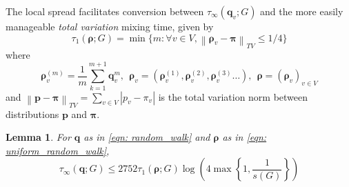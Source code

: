 \documentclass{article}
\newcommand{\abs}[1]{\left \lvert #1 \right \rvert}
\newcommand{\norm}[1]{\left\lVert#1\right\rVert}
\newcommand{\1}{\mathbf{1}}
\newcommand{\pbf}{\mathbf{p}}
\newcommand{\qbf}{\mathbf{q}}
\newcommand{\pibf}{\bm{\pi}}
\newcommand{\rhobf}{\bm{\rho}}
\theoremstyle{aldenthm}
\newtheorem{lemma}{Lemma}
\begin{document}
The local spread facilitates conversion between $\tau_{\infty}(\qbf_v; G)$ and the more easily manageable \emph{total variation} mixing time, given by
\begin{equation*}
\tau_1(\rhobf; G) = \min\biggl\{m: \forall v \in V, \norm{\rhobf_v - \pibf}_{TV} \leq 1/4 \biggr\}
\end{equation*}
where 
\begin{equation}
\label{eqn: uniform_random_walk}
\rhobf_{v}^{(m)} = \frac{1}{m}\sum_{k = 1}^{m+1} \qbf_{v}^{m}, ~~ \rhobf_v = \left( \rhobf_{v}^{(1)}, \rhobf_{v}^{(2)}, \rhobf_{v}^{(3)} \ldots \right), ~~ \rhobf = \left( \rhobf_v \right)_{v \in V}
\end{equation}
and $\norm{\pbf - \pibf}_{TV} = \sum_{v \in V}\abs{p_v - \pi_v}$ is the total variation norm between distributions $\pbf$ and $\pibf$. 
\begin{lemma}
	\label{lem: tv_mixing_to_pointwise_mixing1}
	For $\qbf$ as in \eqref{eqn: random_walk} and $\rhobf$ as in \eqref{eqn: uniform_random_walk},
	\begin{equation*}
	\tau_{\infty}(\qbf; G) \leq 2752 \tau_1(\rhobf; G) \log \left(4 \max\left\{1, \frac{1}{s(G)}\right\}\right)
	\end{equation*}
\end{lemma}
\end{document}
